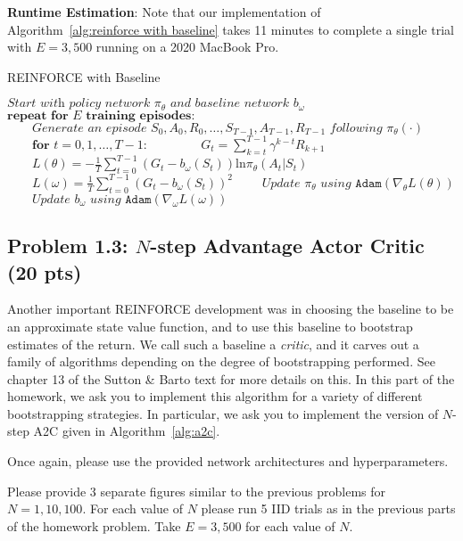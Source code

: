 \documentclass[12pt]{article}
\begin{document}
\textbf{Runtime Estimation}: Note that our implementation of Algorithm~\ref{alg:reinforce with baseline} takes 11 minutes to complete a single trial with $E=3,500$ running on a 2020 MacBook Pro.

\begin{algorithm}
\caption{REINFORCE with Baseline\label{alg:reinforce with baseline}}
\begin{algorithmic}[1]
\State $\textit{Start with policy network } \pi_\theta \textit{ and baseline network } b_{\omega}$
\State $\textbf{repeat for $E$ training episodes:}$
\State $\qquad\textit{Generate an episode } S_0, A_0, R_0, \ldots, S_{T-1}, A_{T-1}, R_{T-1} \textit{ following } \pi_\theta(\cdot)$
\State $\qquad\textbf{for } t = 0 , 1 , \dots , T-1 $: \label{line:reinforce with baseline:1}
\State $\qquad\qquad G_t = \sum_{k=t}^{T-1}\gamma^{k-t}R_{k+1}$ \label{line:reinforce with baseline:2}
\State $\qquad L(\theta) = -\frac{1}{T} \sum_{t=0}^{T-1} (G_t-b_{\omega}(S_t)) \text{ln} \pi_\theta(A_t | S_t)$
\State $\qquad L(\omega) = \frac{1}{T} \sum_{t=0}^{T-1} (G_t - b_{\omega}(S_t))^2 $
\State $\qquad\textit{Update $\pi_\theta$ using } \texttt{Adam}\left(\nabla_\theta L(\theta)\right)$
\State $\qquad\textit{Update $b_\omega$ using } \texttt{Adam}\left(\nabla_\omega L(\omega)\right)$
\EndProcedure
\end{algorithmic}
\label{alg:REINFORCE}
\end{algorithm}
\clearpage

\subsection*{Problem 1.3: $N$-step Advantage Actor Critic (20 pts)}
Another important REINFORCE development was in choosing the baseline to be an approximate state value function, and to use this baseline to bootstrap estimates of the return. We call such a baseline a \textit{critic}, and it carves out a family of algorithms depending on the degree of bootstrapping performed. See chapter 13 of the Sutton \& Barto text for more details on this. In this part of the homework, we ask you to implement this algorithm for a variety of different bootstrapping strategies. In particular, we ask you to implement the version of $N$-step A2C given in Algorithm~\ref{alg:a2c}.

Once again, please use the provided network architectures and hyperparameters. 

Please provide 3 separate figures similar to the previous problems for $N=1,10,100$. For each value of $N$ please run 5 IID trials as in the previous parts of the homework problem. Take $E=3,500$ for each value of $N$.
\end{document}

